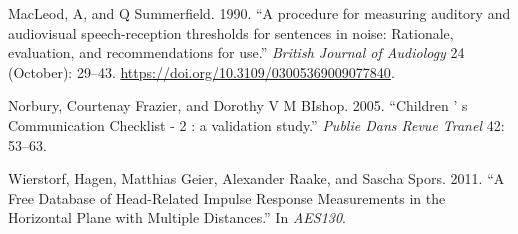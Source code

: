 \documentclass[a4paper,nobind]{templates/ociamthesis}
\newcommand*{\bibtitle}{References}
\begin{document}
\begin{cslreferences}
\leavevmode\hypertarget{ref-MacLeod1990}{}%
MacLeod, A, and Q Summerfield. 1990. ``A procedure for measuring
auditory and audiovisual speech-reception thresholds for sentences in
noise: Rationale, evaluation, and recommendations for use.''
\emph{British Journal of Audiology} 24 (October): 29--43.
\url{https://doi.org/10.3109/03005369009077840}.

\leavevmode\hypertarget{ref-Norbury2005}{}%
Norbury, Courtenay Frazier, and Dorothy V M BIshop. 2005. ``Children ' s
Communication Checklist - 2 : a validation study.'' \emph{Publie Dans
Revue Tranel} 42: 53--63.

\leavevmode\hypertarget{ref-Wierstorf2011}{}%
Wierstorf, Hagen, Matthias Geier, Alexander Raake, and Sascha Spors.
2011. ``A Free Database of Head-Related Impulse Response Measurements in
the Horizontal Plane with Multiple Distances.'' In \emph{AES130}.
\end{cslreferences}




\setlength{\baselineskip}{0pt} %

{\renewcommand*\MakeUppercase[1]{#1}%
\printbibliography[heading=bibintoc,title={\bibtitle}]}
\end{document}
